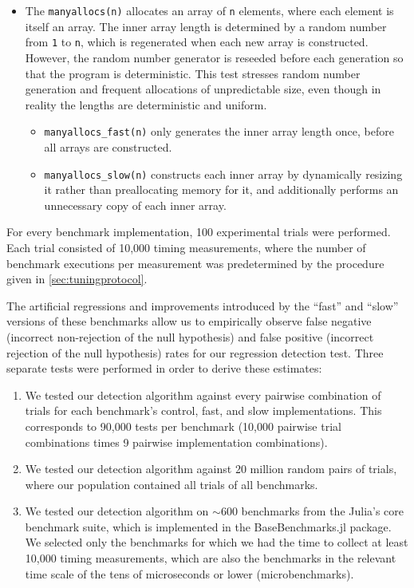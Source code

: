 \documentclass[conference]{IEEEtran}
\begin{document}
\begin{itemize}
\begin{itemize}
    \end{itemize}
    \item The \lstinline|manyallocs(n)| allocates an array of \lstinline|n| elements, where each element is itself an array. The inner array length is determined by a random number from \lstinline|1| to \lstinline|n|, which is regenerated when each new array is constructed. However, the random number generator is reseeded before each generation so that the program is deterministic. This test stresses random number generation and frequent allocations of unpredictable size, even though in reality the lengths are deterministic and uniform.
    \begin{itemize}
        \item \lstinline|manyallocs_fast(n)| only generates the inner array length once, before all arrays are constructed.
        \item \lstinline|manyallocs_slow(n)| constructs each inner array by dynamically resizing it rather than preallocating memory for it, and additionally performs an unnecessary copy of each inner array.
    \end{itemize}
\end{itemize}

For every benchmark implementation, 100 experimental trials were performed. Each trial
consisted of 10,000 timing measurements, where the number of benchmark executions per
measurement was predetermined by the procedure given in \ref{sec:tuningprotocol}.

The artificial regressions and improvements introduced by the ``fast'' and ``slow'' versions
of these benchmarks allow us to empirically observe false negative (incorrect non-rejection
of the null hypothesis) and false positive (incorrect rejection of the null hypothesis)
rates for our regression detection test. Three separate tests were performed in order to
derive these estimates:

\begin{enumerate}
\item We tested our detection algorithm against every pairwise combination of trials for each
benchmark's control, fast, and slow implementations. This corresponds to 90,000 tests per
benchmark (10,000 pairwise trial combinations times 9 pairwise implementation combinations).
\item We tested our detection algorithm against 20 million random pairs of trials, where our
population contained all trials of all benchmarks. %
\item We tested our detection algorithm on $\sim$600 benchmarks from the Julia's core benchmark
suite, which is implemented in the BaseBenchmarks.jl package. We selected only the
benchmarks for which we had the time to collect at least 10,000 timing measurements, which
are also the benchmarks in the relevant time scale of the tens of microseconds or lower
(microbenchmarks). %
\end{enumerate}
\end{document}

